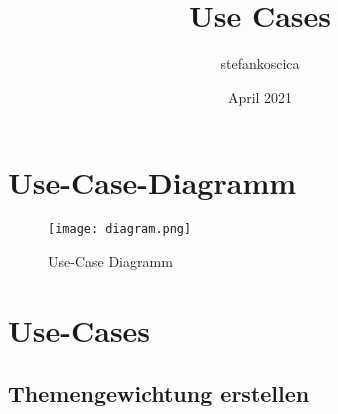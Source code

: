 \documentclass{article}
\title{Use Cases}
\author{stefankoscica }
\date{April 2021}
\begin{document}
\maketitle

\section{Use-Case-Diagramm}

\begin{figure}[H]
\centering
\texttt{[image: diagram.png]}
\caption{Use-Case Diagramm}
\label{fig:diagram}
\end{figure}


\section{Use-Cases}
\subsection{Themengewichtung erstellen}
\end{document}
